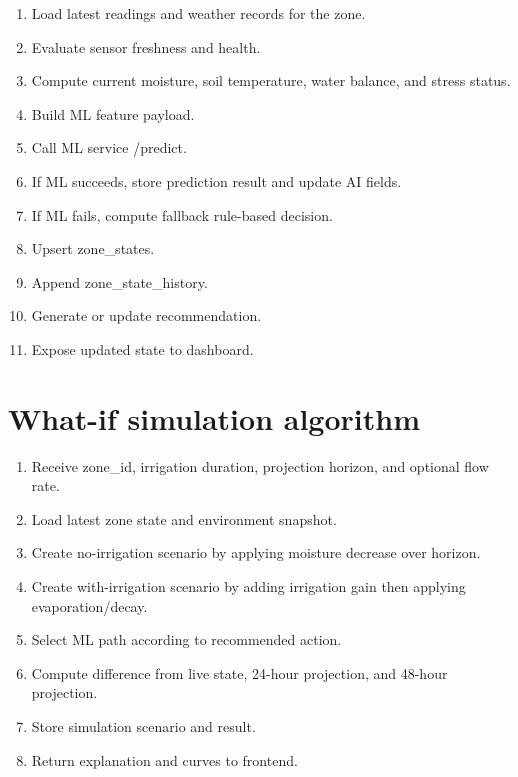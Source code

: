 \begin{enumerate}

\item Load latest readings and weather records for the zone.

\item Evaluate sensor freshness and health.

\item Compute current moisture, soil temperature, water balance, and stress status.

\item Build ML feature payload.

\item Call ML service /predict.

\item If ML succeeds, store prediction result and update AI fields.

\item If ML fails, compute fallback rule-based decision.

\item Upsert zone\_states.

\item Append zone\_state\_history.

\item Generate or update recommendation.

\item Expose updated state to dashboard.

\end{enumerate}

\section{What-if simulation algorithm}

\begin{enumerate}

\item Receive zone\_id, irrigation duration, projection horizon, and optional flow rate.

\item Load latest zone state and environment snapshot.

\item Create no-irrigation scenario by applying moisture decrease over horizon.

\item Create with-irrigation scenario by adding irrigation gain then applying evaporation/decay.

\item Select ML path according to recommended action.

\item Compute difference from live state, 24-hour projection, and 48-hour projection.

\item Store simulation scenario and result.

\item Return explanation and curves to frontend.

\end{enumerate}

